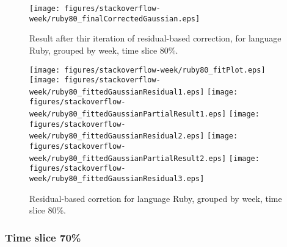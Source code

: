 \begin{figure}[]
\centering
{\texttt{[image: figures/stackoverflow-week/ruby80\_finalCorrectedGaussian.eps]}}
\caption{Result after thir iteration of residual-based correction, for language Ruby, grouped by week, time slice 80\%.}
\end{figure}


\begin{figure}[hb]
\centering
{}
{\texttt{[image: figures/stackoverflow-week/ruby80\_fitPlot.eps]}}
{\texttt{[image: figures/stackoverflow-week/ruby80\_fittedGaussianResidual1.eps]}}
{\texttt{[image: figures/stackoverflow-week/ruby80\_fittedGaussianPartialResult1.eps]}}
{\texttt{[image: figures/stackoverflow-week/ruby80\_fittedGaussianResidual2.eps]}}
{\texttt{[image: figures/stackoverflow-week/ruby80\_fittedGaussianPartialResult2.eps]}}
{\texttt{[image: figures/stackoverflow-week/ruby80\_fittedGaussianResidual3.eps]}}
\caption{Residual-based corretion for language Ruby, grouped by week, time slice 80\%.}
\end{figure}


\clearpage 
\newpage 


\FloatBarrier

\subsubsection{Time slice 70\%}

